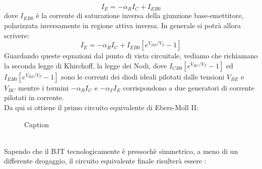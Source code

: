 \begin{equation}
    I_E=-\alpha_R I_C +I_{EB0}
\end{equation}
dove $I_{EB0}$ è la corrente di saturazione inversa della giunzione base-emettitore,
polarizzata inversamente in regione attiva inversa. In generale si potrà allora
scrivere: 
\begin{equation}
    I_E = -\alpha_R I_C +I_{EB0}\left[ e^{V_{BE}/V_T} -1 \right]
\end{equation}
Guardando queste equazioni dal punto di vista circuitale, vediamo che richiamano la seconda legge di Khirchoff, la legge dei Nodi, dove $I_{CB0}\left[ e^{V_{BC}/V_T} -1 \right]$ ed $I_{EB0}\left[ e^{V_{BE}/V_T} -1 \right]
$
sono le correnti dei diodi ideali pilotati dalle tensioni $V_{BE}$ e $V_{BC}$ mentre i termini $-\alpha_R I_C$ e $-\alpha_F I_E$ corrispondono a due generatori di corrente pilotati in corrente.\\
Da qui si ottiene il primo circuito equivalente di Ebers-Moll II:
\begin{figure}[hbt!]
    \centering
    \caption{Caption}
    \label{fig:enter-label}
\end{figure}
\\%
Sapendo che il BJT tecnologicamente è pressochè simmetrico, a meno di un differente drogaggio, il circuito equivalente finale risulterà essere :
%

